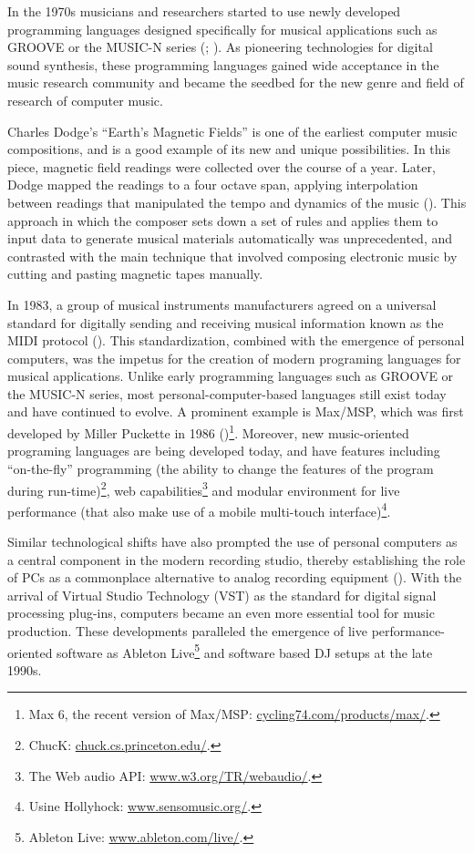 \documentclass[a4paper,11pt]{article}
\begin{document}
In the 1970s musicians and researchers started to use newly developed programming languages designed specifically for musical applications such as GROOVE or the MUSIC-N series (\cite{mathews70}; \cite{mathews69}).
As pioneering technologies for digital sound synthesis, these programming languages gained wide acceptance in the music research community and became the seedbed for the new genre and field of research of computer music.

Charles Dodge's ``Earth's Magnetic Fields'' is one of the earliest computer music compositions, and is a good example of its new and unique possibilities.
In this piece, magnetic field readings were collected over the course of a year.
Later, Dodge mapped the readings to a four octave span, applying interpolation between readings that manipulated the tempo and dynamics of the music (\cite{scriptsgrooves14}).
This approach in which the composer sets down a set of rules and applies them to input data to generate musical materials automatically was unprecedented, and contrasted with the main technique that involved composing electronic music by cutting and pasting magnetic tapes manually.

In 1983, a group of musical instruments manufacturers agreed on a universal standard for digitally sending and receiving musical information known as the MIDI protocol (\cite{web:quinn}).
This standardization, combined with the emergence of personal computers, was the impetus for the creation of modern programing languages for musical applications.
Unlike early programming languages such as GROOVE or the MUSIC-N series, most personal-computer-based languages still exist today and have continued to evolve.
A prominent example is Max/MSP, which was first developed by Miller Puckette in 1986 (\cite[p. 16]{winkler01})\footnote{Max 6, the recent version of Max/MSP: \href{http://cycling74.com/products/max/}{cycling74.com/products/max/}.}.
Moreover, new music-oriented programing languages are being developed today, and have features including ``on-the-fly'' programming (the ability to change the features of the program during run-time)\footnote{ChucK: \href{http://chuck.cs.princeton.edu/}{chuck.cs.princeton.edu/}.}, web capabilities\footnote{The Web audio API: \href{http://www.w3.org/TR/webaudio/}{www.w3.org/TR/webaudio/}.} and modular environment for live performance (that also make use of a mobile multi-touch interface)\footnote{Usine Hollyhock: \href{http://www.sensomusic.org/}{www.sensomusic.org/}.}.

Similar technological shifts have also prompted the use of personal computers as a central component in the modern recording studio, thereby establishing the role of PCs as a commonplace alternative to analog recording equipment (\cite{leider:04}).
With the arrival of Virtual Studio Technology (VST) as the standard for digital signal processing plug-ins, computers became an even more essential tool for music production.
These developments paralleled the emergence of live performance-oriented software as Ableton Live\footnote{Ableton Live: \href{http://www.ableton.com/en/live/}{www.ableton.com/live/}.} and software based DJ setups at the late 1990s.
\end{document}
